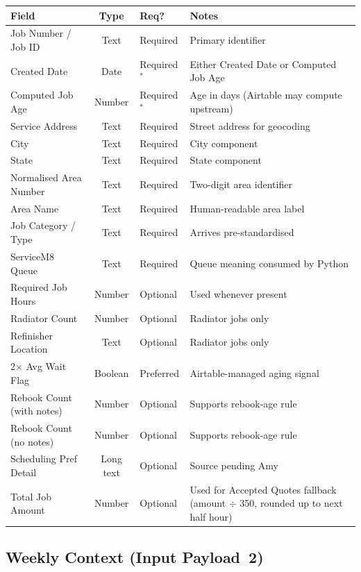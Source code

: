 \documentclass[12pt]{article}
\begin{document}
\medskip
{\small
\begin{longtable}{lclp{4cm}}
\toprule
\textbf{Field} & \textbf{Type} & \textbf{Req?} & \textbf{Notes} \\
\midrule
Job Number / Job ID      & Text    & Required  & Primary identifier \\
Created Date             & Date    & Required$^*$  & Either Created Date or Computed Job Age \\
Computed Job Age         & Number  & Required$^*$  & Age in days (Airtable may compute upstream) \\
Service Address          & Text    & Required  & Street address for geocoding \\
City                     & Text    & Required  & City component \\
State                    & Text    & Required  & State component \\
Normalised Area Number   & Text    & Required  & Two-digit area identifier \\
Area Name                & Text    & Required  & Human-readable area label \\
Job Category / Type      & Text    & Required  & Arrives pre-standardised \\
ServiceM8 Queue          & Text    & Required  & Queue meaning consumed by Python \\
Required Job Hours       & Number  & Optional  & Used whenever present \\
Radiator Count           & Number  & Optional  & Radiator jobs only \\
Refinisher Location      & Text    & Optional  & Radiator jobs only \\
2$\times$ Avg Wait Flag  & Boolean & Preferred & Airtable-managed aging signal \\
Rebook Count (with notes)  & Number & Optional & Supports rebook-age rule \\
Rebook Count (no notes)    & Number & Optional & Supports rebook-age rule \\
Scheduling Pref Detail   & Long text & Optional & Source pending Amy \\
Total Job Amount         & Number & Optional & Used for Accepted Quotes fallback (amount $\div$ 350, rounded up to next half hour) \\
\bottomrule
\end{longtable}
}

\subsection*{Weekly Context (Input Payload~2)}
\end{document}
